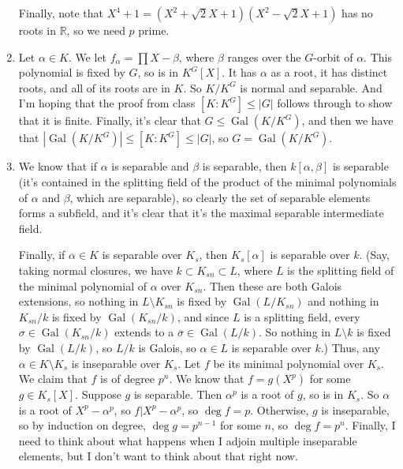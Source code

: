 \documentclass{article}
\newcommand\RR{\mathbb R}
\DeclareMathOperator\Gal{Gal}
\begin{document}
\begin{enumerate}
      Finally, note that $X^4+1 = (X^2 + \sqrt2X + 1)(X^2 - \sqrt2X + 1)$ has no
      roots in $\RR$, so we need $p$ prime.

   \item Let $\alpha \in K$. We let $f_\alpha = \prod X-\beta$, where $\beta$
      ranges over the $G$-orbit of $\alpha$. This polynomial is fixed by $G$, so
      is in $K^G[X]$. It has $\alpha$ as a root, it has distinct roots, and all
      of its roots are in $K$. So $K / K^G$ is normal and separable. And I'm
      hoping that the proof from class $[K:K^G] \leq |G|$ follows through to
      show that it is finite. Finally, it's clear that $G \leq \Gal(K/K^G)$, and
      then we have that $|\Gal(K/K^G)| \leq [K:K^G] \leq |G|$, so $G =
      \Gal(K/K^G)$.

   \item We know that if $\alpha$ is separable and $\beta$ is separable, then
      $k[\alpha,\beta]$ is separable (it's contained in the splitting field of
      the product of the minimal polynomials of $\alpha$ and $\beta$, which are
      separable), so clearly the set of separable elements forms a subfield, and
      it's clear that it's the maximal separable intermediate field.

      Finally, if $\alpha \in K$ is separable over $K_s$, then $K_s[\alpha]$ is
      separable over $k$. (Say, taking normal closures, we have $k \subset
      K_{sn} \subset L$, where $L$ is the splitting field of the minimal
      polynomial of $\alpha$ over $K_{sn}$. Then these are both Galois
      extensions, so nothing in $L \setminus K_{sn}$ is fixed by
      $\Gal(L/K_{sn})$ and nothing in $K_{sn}/k$ is fixed by $\Gal(K_{sn}/k)$,
      and since $L$ is a splitting field, every $\sigma \in \Gal(K_{sn}/k)$
      extends to a $\overline\sigma \in \Gal(L/k)$. So nothing in $L \setminus
      k$ is fixed by $\Gal(L/k)$, so $L/k$ is Galois, so $\alpha \in L$ is
      separable over $k$.) Thus, any $\alpha \in K \setminus K_s$ is inseparable
      over $K_s$. Let $f$ be its minimal polynomial over $K_s$. We claim that
      $f$ is of degree $p^n$. We know that $f = g(X^p)$ for some $g \in K_s[X]$.
      Suppose $g$ is separable. Then $\alpha^p$ is a root of $g$, so is in
      $K_s$. So $\alpha$ is a root of $X^p - \alpha^p$, so $f | X^p - \alpha^p$,
      so $\deg f = p$. Otherwise, $g$ is inseparable, so by induction on degree,
      $\deg g = p^{n-1}$ for some $n$, so $\deg f = p^n$. Finally, I need to
      think about what happens when I adjoin multiple inseparable elements, but
      I don't want to think about that right now.


\end{enumerate}
\end{document}
